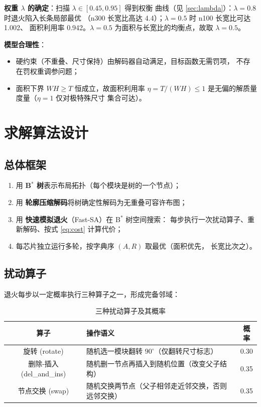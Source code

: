\documentclass[12pt,a4paper]{article}
\begin{document}
\textbf{权重 $\lambda$ 的确定}：扫描 $\lambda \in [0.45, 0.95]$ 得到权衡
曲线（见 \ref{sec:lambda}）：$\lambda = 0.8$ 时退火陷入长条局部最优
（n300 长宽比高达 4.4）；$\lambda = 0.5$ 时 n100 长宽比可达 1.002、
面积利用率 0.942。$\lambda = 0.5$ 为面积与长宽比的均衡点，故取
$\lambda = 0.5$。

\textbf{模型合理性}：
\begin{itemize}
    \item 硬约束（不重叠、尺寸保持）由解码器自动满足，目标函数无需罚项，
    不存在罚权重调参问题；
    \item 面积下界 $WH \ge T$ 恒成立，故面积利用率
    $\eta = T/(WH) \le 1$ 是无偏的解质量度量（$\eta = 1$ 仅对极特殊尺寸
    集合可达）。
\end{itemize}

\section{求解算法设计}

\subsection{总体框架}

\begin{tcolorbox}[colback=blue!5, colframe=blue!60, title=算法流程]
\begin{enumerate}
    \item 用 \textbf{B$^*$ 树}表示布局拓扑（每个模块是树的一个节点）；
    \item 用 \textbf{轮廓压缩解码}将树确定性解码为无重叠可容许布图；
    \item 用 \textbf{快速模拟退火}（Fast-SA）在 B$^*$ 树空间搜索：
    每步执行一次扰动算子、重新解码、按式 \eqref{eq:cost} 计算代价；
    \item 每芯片独立运行多轮，按字典序 $(A, R)$ 取最优（面积优先，
    长宽比次之）。
\end{enumerate}
\end{tcolorbox}

\subsection{扰动算子}

退火每步以一定概率执行三种算子之一，形成完备邻域：

\begin{table}[H]
\centering
\small
\caption{三种扰动算子及其概率}
\begin{tabular}{clc}
\toprule
算子 & 操作语义 & 概率 \\
\midrule
旋转 (rotate) & 随机选一模块翻转 $90^\circ$（仅翻转尺寸标志） & 0.30 \\
删除-插入 (del\_and\_ins) & 随机删一节点再插入到随机位置（改变父子结构） & 0.35 \\
节点交换 (swap) & 随机交换两节点（父子相邻走近邻交换，否则远邻交换） & 0.35 \\
\bottomrule
\end{tabular}
\end{table}
\end{document}
